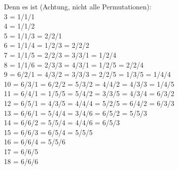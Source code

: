 \documentclass{article}
\begin{document}
Denn es ist (Achtung, nicht alle Permutationen):\\
3 = 1/1/1\\
4 = 1/1/2\\
5 = 1/1/3 = 2/2/1\\
6 = 1/1/4 = 1/2/3 = 2/2/2\\
7 = 1/1/5 = 2/2/3 = 3/3/1 = 1/2/4\\
8 = 1/1/6 = 2/3/3 = 4/3/1 = 1/2/5 = 2/2/4\\
9 = 6/2/1 = 4/3/2 = 3/3/3 = 2/2/5 = 1/3/5 = 1/4/4\\
10 = 6/3/1 = 6/2/2 = 5/3/2 = 4/4/2 = 4/3/3 = 1/4/5\\
11 = 6/4/1 = 1/5/5 = 5/4/2 = 3/3/5 = 4/3/4 = 6/3/2\\
12 = 6/5/1 = 4/3/5 = 4/4/4 = 5/2/5 = 6/4/2 = 6/3/3\\
13 = 6/6/1 = 5/4/4 = 3/4/6 = 6/5/2 = 5/5/3\\
14 = 6/6/2 = 5/5/4 = 4/4/6 = 6/5/3\\
15 = 6/6/3 = 6/5/4 = 5/5/5\\
16 = 6/6/4 = 5/5/6\\
17 = 6/6/5\\
18 = 6/6/6
\end{document}

